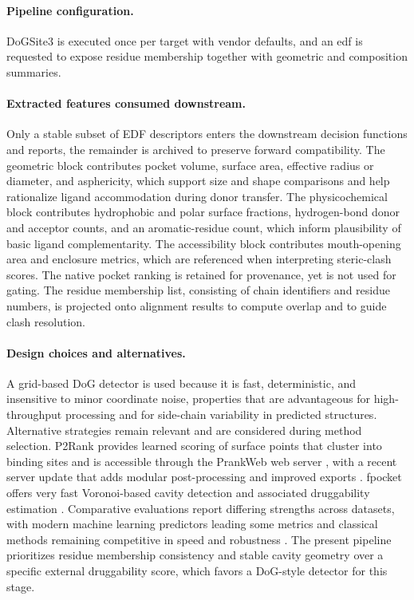 \paragraph{Pipeline configuration.}
DoGSite3 is executed once per target with vendor defaults, and an \gls{edf} is requested to expose residue membership together with geometric and composition summaries.

\paragraph{Extracted features consumed downstream.}
Only a stable subset of EDF descriptors enters the downstream decision functions and reports, the remainder is archived to preserve forward compatibility. The geometric block contributes pocket volume, surface area, effective radius or diameter, and asphericity, which support size and shape comparisons and help rationalize ligand accommodation during donor transfer. The physicochemical block contributes hydrophobic and polar surface fractions, hydrogen-bond donor and acceptor counts, and an aromatic-residue count, which inform plausibility of basic ligand complementarity. The accessibility block contributes mouth-opening area and enclosure metrics, which are referenced when interpreting steric-clash scores. The native pocket ranking is retained for provenance, yet is not used for gating. The residue membership list, consisting of chain identifiers and residue numbers, is projected onto alignment results to compute overlap and to guide clash resolution.

\paragraph{Design choices and alternatives.}
A grid-based DoG detector is used because it is fast, deterministic, and insensitive to minor coordinate noise, properties that are advantageous for high-throughput processing and for side-chain variability in predicted structures. Alternative strategies remain relevant and are considered during method selection. P2Rank provides learned scoring of surface points that cluster into binding sites and is accessible through the PrankWeb web server \cite{krivakP2RankMachineLearning2018,jendelePrankWebWebServer2019}, with a recent server update that adds modular post-processing and improved exports \cite{polakPrankWeb4Modular2025,polakPrankWeb4Modular2025a}. fpocket offers very fast Voronoi-based cavity detection and associated druggability estimation \cite{leguillouxFpocketOpenSource2009,schmidtkeUnderstandingPredictingDruggability2010}. Comparative evaluations report differing strengths across datasets, with modern machine learning predictors leading some metrics and classical methods remaining competitive in speed and robustness \cite{utgesComparativeEvaluationMethods2024,jiaComprehensiveReviewProteincentric2024}. The present pipeline prioritizes residue membership consistency and stable cavity geometry over a specific external druggability score, which favors a DoG-style detector for this stage.

